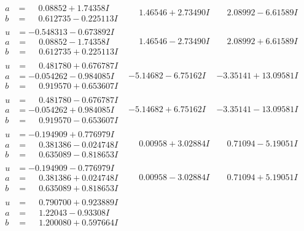 \documentclass[1p]{elsarticle_modified}
\theoremstyle{definition}
\begin{document}
$$\begin{array}{c|c|c}
\begin{aligned}
a &= \phantom{-}0.08852 + 1.74358 I \\
b &= \phantom{-}0.612735 - 0.225113 I\end{aligned}
 & \phantom{-}1.46546 + 2.73490 I & \phantom{-}2.08992 - 6.61589 I \\ \hline\begin{aligned}
u &= -0.548313 - 0.673892 I \\
a &= \phantom{-}0.08852 - 1.74358 I \\
b &= \phantom{-}0.612735 + 0.225113 I\end{aligned}
 & \phantom{-}1.46546 - 2.73490 I & \phantom{-}2.08992 + 6.61589 I \\ \hline\begin{aligned}
u &= \phantom{-}0.481780 + 0.676787 I \\
a &= -0.054262 - 0.984085 I \\
b &= \phantom{-}0.919570 + 0.653607 I\end{aligned}
 & -5.14682 - 6.75162 I & -3.35141 + 13.09581 I \\ \hline\begin{aligned}
u &= \phantom{-}0.481780 - 0.676787 I \\
a &= -0.054262 + 0.984085 I \\
b &= \phantom{-}0.919570 - 0.653607 I\end{aligned}
 & -5.14682 + 6.75162 I & -3.35141 - 13.09581 I \\ \hline\begin{aligned}
u &= -0.194909 + 0.776979 I \\
a &= \phantom{-}0.381386 - 0.024748 I \\
b &= \phantom{-}0.635089 - 0.818653 I\end{aligned}
 & \phantom{-}0.00958 + 3.02884 I & \phantom{-}0.71094 - 5.19051 I \\ \hline\begin{aligned}
u &= -0.194909 - 0.776979 I \\
a &= \phantom{-}0.381386 + 0.024748 I \\
b &= \phantom{-}0.635089 + 0.818653 I\end{aligned}
 & \phantom{-}0.00958 - 3.02884 I & \phantom{-}0.71094 + 5.19051 I \\ \hline\begin{aligned}
u &= \phantom{-}0.790700 + 0.923889 I \\
a &= \phantom{-}1.22043 - 0.93308 I \\
b &= \phantom{-}1.200080 + 0.597664 I\end{aligned}

\end{array}$$
\end{document}
